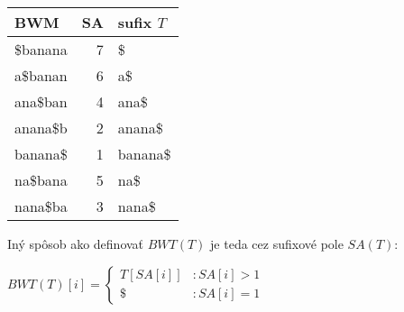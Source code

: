     \bigskip
    
    \begin{example}
        \begin{tabular}{ | l  | r | l | }
            \hline
            \textbf{BWM} & \textbf{SA} & \textbf{sufix $T$} \\ \hline 
            \$banana     & 7           & \$                 \\ \hline
            a\$banan     & 6           & a\$                \\ \hline
            ana\$ban     & 4           & ana\$              \\ \hline
            anana\$b     & 2           & anana\$            \\ \hline
            banana\$     & 1           & banana\$           \\ \hline
            na\$bana     & 5           & na\$               \\ \hline
            nana\$ba     & 3           & nana\$             \\ \hline
        \end{tabular}
    \end{example}
    
    \bigskip
    
    Iný spôsob ako definovať $BWT(T)$ je teda cez sufixové pole $SA(T)$:
    
    \bigskip
    
    $
        BWT(T)[i] = \begin{cases}
                        T[SA[i]] & : SA[i] > 1 \\ 
                        \$       & : SA[i] = 1
                    \end{cases}
    $                    
    
    
      
			
